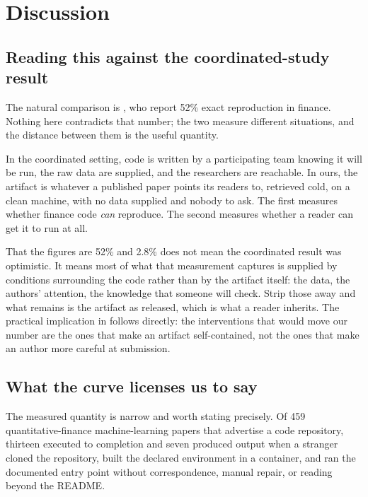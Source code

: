 \section{Discussion}\label{sec:discussion}

\subsection{Reading this against the coordinated-study result}\label{sec:vs_perignon}

The natural comparison is \citet{Perignon2024}, who report 52\% exact
reproduction in finance. Nothing here contradicts that number; the two measure
different situations, and the distance between them is the useful quantity.

In the coordinated setting, code is written by a participating team knowing it
will be run, the raw data are supplied, and the researchers are reachable. In
ours, the artifact is whatever a published paper points its readers to, retrieved
cold, on a clean machine, with no data supplied and nobody to ask. The first
measures whether finance code \emph{can} reproduce. The second measures whether a
reader can get it to run at all.

That the figures are 52\% and 2.8\% does not mean the coordinated result was
optimistic. It means most of what that measurement captures is supplied by
conditions surrounding the code rather than by the artifact itself: the data, the
authors' attention, the knowledge that someone will check. Strip those away and
what remains is the artifact as released, which is what a reader inherits. The
practical implication in  follows directly: the interventions
that would move our number are the ones that make an artifact self-contained,
not the ones that make an author more careful at submission.

\subsection{What the curve licenses us to say}\label{sec:claim_scope}

The measured quantity is narrow and worth stating precisely. Of 459
quantitative-finance machine-learning papers that advertise a code repository,
thirteen executed to completion and seven produced output when a stranger cloned
the repository, built the declared environment in a container, and ran the
documented entry point without correspondence, manual repair, or reading beyond
the README.

